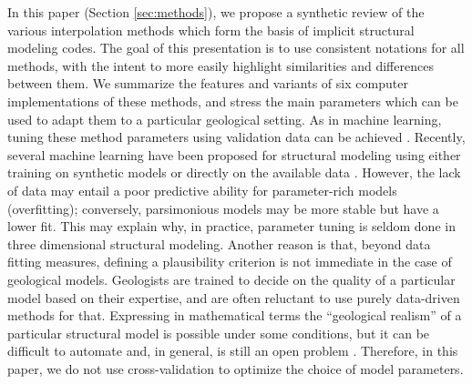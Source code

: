 \documentclass[preprint]{ring20}
\begin{document}
In this paper (Section \ref{sec:methods}), we propose a synthetic review of the various interpolation methods which form the basis of implicit structural modeling codes. The goal of this presentation is to use consistent notations for all methods, with the intent to more easily highlight similarities and differences between them. We summarize the features and variants of six computer implementations of these methods, and stress the main parameters which can be used to adapt them to a particular geological setting. As in machine learning, tuning these method parameters using validation data can be achieved \citep{Goncalves2017CG}. Recently, several machine learning have been proposed for structural modeling using either training on synthetic models \citep{Bi2022GMD} or directly on the available data \citep{Hillier2021MG}. 
However, the lack of data may entail a poor predictive ability for parameter-rich models (overfitting); conversely, parsimonious models may be more stable but have a lower fit. This may explain why, in practice, parameter tuning is seldom done in three dimensional structural modeling. Another reason is that, beyond data fitting measures, defining a plausibility criterion is not immediate in the case of geological models. Geologists are trained to decide on the quality of a particular model based on their expertise, and are often reluctant to use purely data-driven methods for that. Expressing in mathematical terms the ``geological realism'' of a particular structural model is possible under some conditions, but it can be difficult to automate and, in general, is still an open problem \citep{Caumon2010MG,Jessell2010T}. Therefore, in this paper, we do not use cross-validation to optimize the choice of model parameters.
\end{document}
